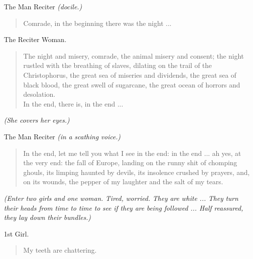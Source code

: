 \documentclass[letterpaper,article,12pt,oneside,notitlepage]{memoir}
\begin{document}
\begin{center}The Man Reciter \textit{(docile.)}\end{center}

\begin{verse}
\hspace{1cm} Comrade, in the beginning there was the night ... \\
\end{verse}

\begin{center}The Reciter Woman.\end{center}

\begin{verse}
\indent The night and misery, comrade, the animal misery and consent; the night rustled with the breathing of slaves, dilating on the trail of the Christophorus, the great sea of miseries and dividends, the great sea of black blood, the great swell of sugarcane, the great ocean of horrors and desolation. \\
\hspace{1cm} In the end, there is, in the end ... \\
\end{verse}

\textit{(She covers her eyes.)}

\clearpage

\begin{center}The Man Reciter \textit{(in a scathing voice.)}\end{center}

\begin{verse}
\indent In the end, let me tell you what I see in the end: in the end ... ah yes, at the very end: the fall of Europe, landing on the runny shit of chomping ghouls, its limping haunted by devils, its insolence crushed by prayers, and, on its wounds, the pepper of my laughter and the salt of my tears. \\
\end{verse}

\textit{(Enter two girls and one woman. Tired, worried. They are white ... They turn their heads from time to time to see if they are being followed ... Half reassured, they lay down their bundles.)}

\begin{center}1st Girl.\end{center}

\begin{verse}
\hspace{1cm} My teeth are chattering. \\
\end{verse}
\end{document}
